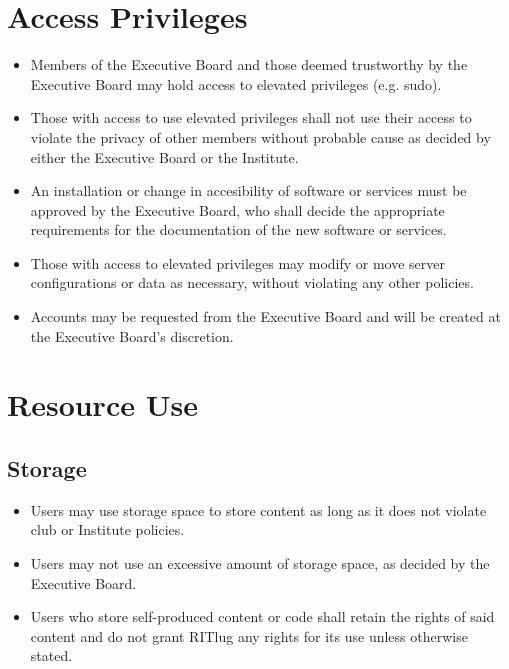 



\section{Access Privileges}

\begin{itemize}
\item Members of the Executive Board and those deemed trustworthy by the Executive Board may hold access to elevated privileges (e.g. sudo).
\item Those with access to use elevated privileges shall not use their access to violate the privacy of other members without probable cause as decided by either the Executive Board or the Institute.
\item An installation or change in accesibility of software or services must be approved by the Executive Board, who shall decide the appropriate requirements for the documentation of the new software or services.
\item Those with access to elevated privileges may modify or move server configurations or data as necessary, without violating any other policies.
\item Accounts may be requested from the Executive Board and will be created at the Executive Board's discretion.
\end{itemize}

\section{Resource Use}

\subsection{Storage}
\begin{itemize}
\item Users may use storage space to store content as long as it does not violate club or Institute policies.
\item Users may not use an excessive amount of storage space, as decided by the Executive Board.
\item Users who store self-produced content or code shall retain the rights of said content and do not grant RITlug any rights for its use unless otherwise stated.
\end{itemize}

